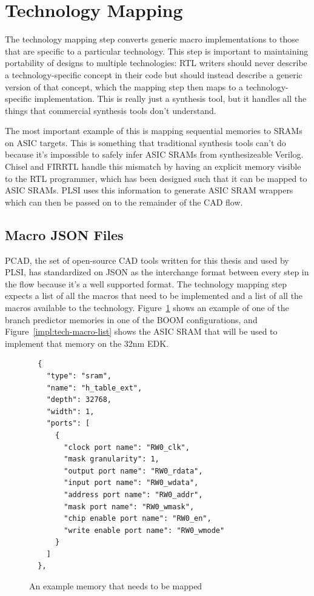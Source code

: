 \documentclass{article}
\begin{document}
\section{Technology Mapping}

The technology mapping step converts generic macro implementations to those
that are specific to a particular technology.  This step is important to
maintaining portability of designs to multiple technologies: RTL writers should
never describe a technology-specific concept in their code but should instead
describe a generic version of that concept, which the mapping step then maps to
a technology-specific implementation.  This is really just a synthesis tool,
but it handles all the things that commercial synthesis tools don't understand.

The most important example of this is mapping sequential memories to SRAMs on
ASIC targets.  This is something that traditional synthesis tools can't do
because it's impossible to safely infer ASIC SRAMs from synthesizeable Verilog.
Chisel and FIRRTL handle this mismatch by having an explicit memory visible to
the RTL programmer, which has been designed such that it can be mapped to ASIC
SRAMs.  PLSI uses this information to generate ASIC SRAM wrappers which can
then be passed on to the remainder of the CAD flow.

\subsection{Macro JSON Files}

PCAD, the set of open-source CAD tools written for this thesis and used by
PLSI, has standardized on JSON as the interchange format between every step in
the flow because it's a well supported format.  The technology mapping step
expects a list of all the macros that need to be implemented and a list of all
the macros available to the technology.  Figure~\ref{impl:core-macro-list}
shows an example of one of the branch predictor memories in one of the BOOM
configurations, and Figure~\ref{impl:tech-macro-list} shows the ASIC SRAM that
will be used to implement that memory on the 32nm EDK.  

\begin{figure}
\begin{verbatim}
  {
    "type": "sram",
    "name": "h_table_ext",
    "depth": 32768,
    "width": 1,
    "ports": [
      {
        "clock port name": "RW0_clk",
        "mask granularity": 1,
        "output port name": "RW0_rdata",
        "input port name": "RW0_wdata",
        "address port name": "RW0_addr",
        "mask port name": "RW0_wmask",
        "chip enable port name": "RW0_en",
        "write enable port name": "RW0_wmode"
      }
    ]
  },
\end{verbatim}
  \caption{An example memory that needs to be mapped}
  \label{impl:core-macro-list}
\end{figure}
\end{document}
